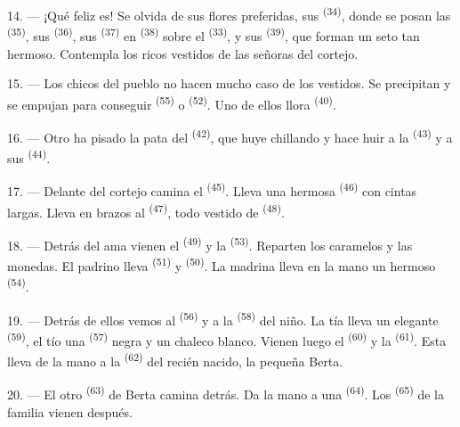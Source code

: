 14. --- ¡Qué feliz es! Se olvida de sus flores preferidas, sus
 \textsuperscript{(34)}, donde se posan las 
\textsuperscript{(35)}, sus  \textsuperscript{(36)}, sus
 \textsuperscript{(37)} en  \textsuperscript{(38)} sobre el
 \textsuperscript{(33)}, y sus  \textsuperscript{(39)}, que forman
un seto tan hermoso. Contempla los ricos vestidos de las señoras del
cortejo.

15. --- Los chicos del pueblo no hacen mucho caso de los vestidos. Se
precipitan y se empujan para conseguir  \textsuperscript{(55)} o
 \textsuperscript{(52)}. Uno de ellos llora \textsuperscript{(40)}.

16. --- Otro ha pisado la pata del  \textsuperscript{(42)}, que huye
chillando y hace huir a la  \textsuperscript{(43)} y a sus
 \textsuperscript{(44)}.

\VUsaut{5.0mm}
\VUsaut{4.0mm}

17. --- Delante del cortejo camina el  \textsuperscript{(45)}. Lleva una
hermosa  \textsuperscript{(46)} con cintas largas. Lleva en brazos al
 \textsuperscript{(47)}, todo vestido de 
\textsuperscript{(48)}.

18. --- Detrás del ama vienen el  \textsuperscript{(49)} y la
 \textsuperscript{(53)}. Reparten los caramelos y las monedas. El
padrino lleva  \textsuperscript{(51)} y 
\textsuperscript{(50)}. La madrina lleva en la mano un hermoso 
\textsuperscript{(54)}.

19. --- Detrás de ellos vemos al  \textsuperscript{(56)} y a la
 \textsuperscript{(58)} del niño. La tía lleva un elegante
 \textsuperscript{(59)}, el tío una  \textsuperscript{(57)}
negra y un chaleco blanco. Vienen luego el  \textsuperscript{(60)} y la
 \textsuperscript{(61)}. Esta lleva de la mano a la 
\textsuperscript{(62)} del recién nacido, la pequeña Berta.

20. --- El otro  \textsuperscript{(63)} de Berta camina detrás. Da la
mano a una  \textsuperscript{(64)}. Los 
\textsuperscript{(65)} de la familia vienen después.

